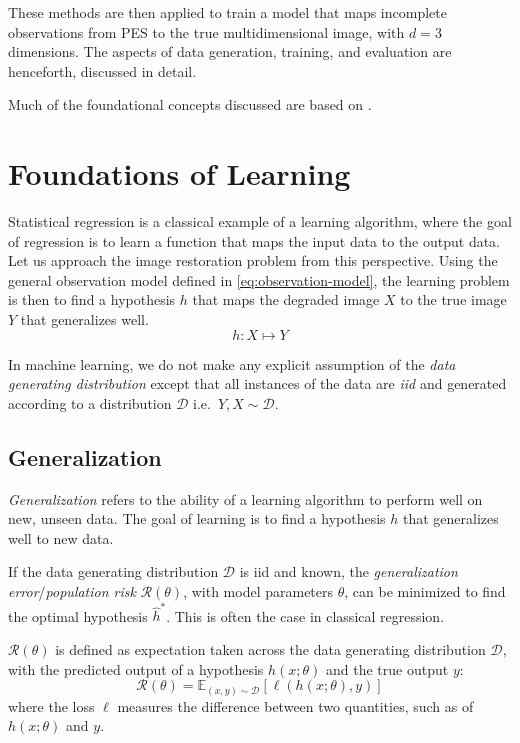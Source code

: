These methods are then applied to train a model that maps incomplete observations from \gls{PES} to the true multidimensional image, with $d=3$ dimensions. The aspects of data generation, training, and evaluation are henceforth, discussed in detail.

Much of the foundational concepts discussed are based on \cite{shalev-shwartzUnderstandingMachineLearning2014a,jamesIntroductionStatisticalLearning2013,tibshiraniElementsStatisticalLearning,goodfellowDeepLearning2016}.

\section{Foundations of Learning}
Statistical regression is a classical example of a learning algorithm, where the goal of regression is to learn a function that maps the input data to the output data.
Let us approach the image restoration problem from this perspective. Using the general observation model defined in \cref{eq:observation-model}, the learning problem is then to find a hypothesis $h$ that maps the degraded image $X$ to the true image $Y$ that generalizes well.
\begin{equation}
    h: X \mapsto Y
\end{equation}

In machine learning, we do not make any explicit assumption of the \textit{data generating distribution} except that all instances of the data are \textit{\gls{iid}} and generated according to a distribution $\mathcal{D}$ i.e.\ $Y, X \sim \mathcal{D}$.

\subsection{Generalization}
\textit{Generalization} refers to the ability of a learning algorithm to perform well on new, unseen data. The goal of learning is to find a hypothesis $h$ that generalizes well to new data. 

If the data generating distribution $\mathcal{D}$ is \gls{iid} and known, the \textit{generalization error}/\textit{population risk} $\mathcal{R}(\theta)$, with model parameters $\theta$, can be minimized to find the optimal hypothesis $\hat{h}^*$. This is often the case in classical regression.

$\mathcal{R}(\theta)$ is defined as expectation taken across the data generating distribution $\mathcal{D}$, with the predicted output of a hypothesis $h(x; \theta)$ and the true output $y$:
\begin{equation}
    \mathcal{R}(\theta) = \mathbb{E}_{(x, y) \sim \mathcal{D}} \left[ \ell(h(x; \theta), y) \right]
\end{equation}
where the loss $\ell$ measures the difference between two quantities, such as of $h(x; \theta)$ and $y$.

